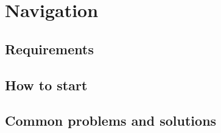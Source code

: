 \documentclass[main.tex]{subfiles}
\begin{document}
	\chapter{Navigation}
	
	\section{Requirements}
	
	\section{How to start}
	
	\section{Common problems and solutions}
\end{document}
